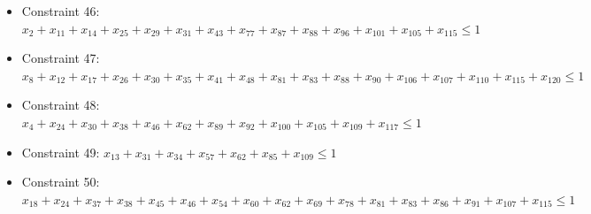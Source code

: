 \documentclass[11pt]{article}
\begin{document}
\begin{itemize}
\item Constraint 46: $x_{2} + x_{11} + x_{14} + x_{25} + x_{29} + x_{31} + x_{43} + x_{77} + x_{87} + x_{88} + x_{96} + x_{101} + x_{105} + x_{115} \le 1$
\item Constraint 47: $x_{8} + x_{12} + x_{17} + x_{26} + x_{30} + x_{35} + x_{41} + x_{48} + x_{81} + x_{83} + x_{88} + x_{90} + x_{106} + x_{107} + x_{110} + x_{115} + x_{120} \le 1$
\item Constraint 48: $x_{4} + x_{24} + x_{30} + x_{38} + x_{46} + x_{62} + x_{89} + x_{92} + x_{100} + x_{105} + x_{109} + x_{117} \le 1$
\item Constraint 49: $x_{13} + x_{31} + x_{34} + x_{57} + x_{62} + x_{85} + x_{109} \le 1$
\item Constraint 50: $x_{18} + x_{24} + x_{37} + x_{38} + x_{45} + x_{46} + x_{54} + x_{60} + x_{62} + x_{69} + x_{78} + x_{81} + x_{83} + x_{86} + x_{91} + x_{107} + x_{115} \le 1$
\end{itemize}
\end{document}
